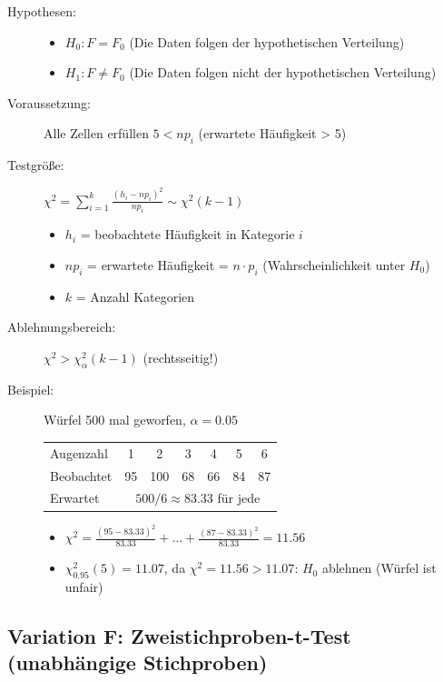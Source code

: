 \documentclass[12pt, a4paper, titlepage, ngerman]{scrartcl}
\begin{document}
\begin{description}
  \item[Hypothesen:] 
    \begin{itemize}
      \item $H_0: F = F_0$ (Die Daten folgen der hypothetischen Verteilung)
      \item $H_1: F \neq F_0$ (Die Daten folgen nicht der hypothetischen Verteilung)
    \end{itemize}
  \item[Voraussetzung:] Alle Zellen erfüllen $5 < n p_i$ (erwartete Häufigkeit > 5)
  \item[Testgröße:] $\chi^2 = \sum_{i=1}^k \frac{(h_i - np_i)^2}{np_i} \sim \chi^2(k-1)$
    \begin{itemize}
      \item $h_i$ = beobachtete Häufigkeit in Kategorie $i$
      \item $np_i$ = erwartete Häufigkeit = $n \cdot p_i$ (Wahrscheinlichkeit unter $H_0$)
      \item $k$ = Anzahl Kategorien
    \end{itemize}
  \item[Ablehnungsbereich:] $\chi^2 > \chi^2_{\alpha}(k-1)$ (rechtsseitig!)
  \item[Beispiel:] Würfel 500 mal geworfen, $\alpha = 0.05$
    \begin{table}[h]
      \centering
      \begin{tabular}{lcccccc}
        Augenzahl & 1 & 2 & 3 & 4 & 5 & 6 \\
        Beobachtet & 95 & 100 & 68 & 66 & 84 & 87 \\
        Erwartet & \multicolumn{6}{c}{$500/6 \approx 83.33$ für jede}
      \end{tabular}
    \end{table}
    \begin{itemize}
      \item $\chi^2 = \frac{(95-83.33)^2}{83.33} + \ldots + \frac{(87-83.33)^2}{83.33} = 11.56$
      \item $\chi^2_{0.95}(5) = 11.07$, da $\chi^2 = 11.56 > 11.07$: $H_0$ ablehnen (Würfel ist unfair)
    \end{itemize}
\end{description}

\subsection{Variation F: Zweistichproben-t-Test (unabhängige Stichproben)}
\end{document}
